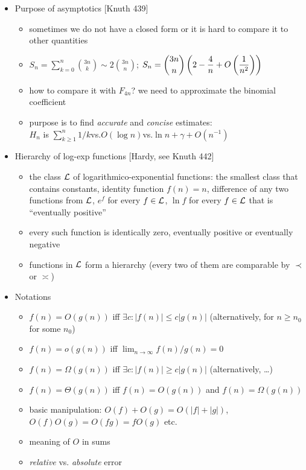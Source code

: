 \documentclass[10pt, a4paper]{article}
\begin{document}
\begin{itemize}
\item
Purpose of asymptotics [Knuth 439]
\begin{itemize}
    \item sometimes we do not have a closed form or it is hard to compare it to other quantities
    \item $\displaystyle S_n = \sum_{k=0}^n {3n\choose k}\sim 2{3n\choose n}$; $\displaystyle S_n = {3n\choose n}\left(2-{4\over n} + O\left({1\over n^2}\right)\right)$
    \item how to compare it with $F_{4n}$? we need to approximate the binomial coefficient
    \item purpose is to find \emph{accurate} and \emph{concise} estimates:\\
            $H_n$ is $\sum_{k\ge 1}^n 1/k$\qquad vs.\qquad $O(\log n)$\qquad vs.\qquad $\ln n + \gamma + O(n^{-1})$ 
\end{itemize}

\item
Hierarchy of log-exp functions [Hardy, see Knuth 442]
\begin{itemize}
    \item the class $\cal L$ of logarithmico-exponential functions:
            the smallest class that contains constants, identity function $f(n) = n$,
            difference of any two functions from $\cal L$,
            $e^f$ for every $f\in {\cal L}$, $\ln f$ for every $f\in {\cal L}$ that is ``eventually positive''
    \item every such function is identically zero, eventually positive or eventually negative
    \item functions in $\cal L$ form a hierarchy (every two of them are comparable by $\prec$ or $\asymp$)
\end{itemize}

\item
Notations
\begin{itemize}
    \item $f(n) = O(g(n))$ iff $\exists c: |f(n)|\le c|g(n)|$ (alternatively, for $n\ge n_0$ for some $n_0$)
    \item $f(n) = o(g(n))$ iff $\lim_{n\to\infty} f(n)/g(n) = 0$
    \item $f(n) = \Omega(g(n))$ iff $\exists c: |f(n)|\ge c|g(n)|$ (alternatively, \dots)
    \item $f(n) = \Theta(g(n))$ iff $f(n) = O(g(n))$ and $f(n) = \Omega(g(n))$
    \item basic manipulation: $O(f)+O(g) = O(|f|+|g|)$, $O(f)O(g)=O(fg)=fO(g)$ etc.
    \item meaning of $O$ in sums
    \item \emph{relative} vs. \emph{absolute} error
\end{itemize}


\end{itemize}
\end{document}
